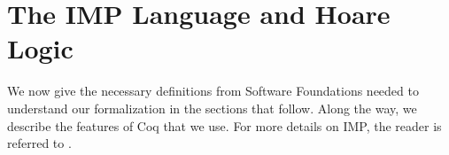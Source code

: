 \documentclass[compsoc,conference,a4paper,10pt,times]{IEEEtran}
\begin{document}

\section{The IMP Language and Hoare Logic}
We now give the necessary definitions from Software
Foundations \cite{SFV2} needed to understand our formalization in the
sections that follow.  Along the way, we describe the features of Coq
that we use.  
For more details on IMP, the reader is referred to \cite{SFV2}.

\end{document}
